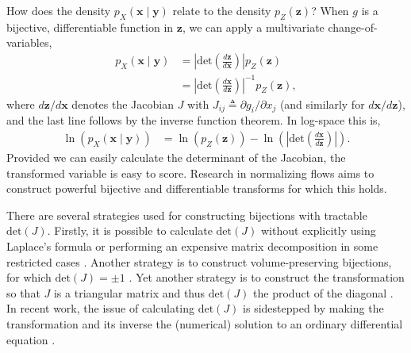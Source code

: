 How does the density $p_X(\mathbf{x}\mid\mathbf{y})$ relate to the density $p_Z(\mathbf{z})$? When $g$ is a bijective, differentiable function in $\mathbf{z}$, we can apply a multivariate change-of-variables,
\begin{align*}
	p_X(\mathbf{x}\mid\mathbf{y}) &= \left|\text{det}\left(\frac{d\mathbf{z}}{d\mathbf{x}}\right)\right|p_Z(\mathbf{z})\\
	&= \left|\text{det}\left(\frac{d\mathbf{x}}{d\mathbf{z}}\right)\right|^{-1}p_Z(\mathbf{z}),
\end{align*}
where $d\mathbf{z}/d\mathbf{x}$ denotes the Jacobian $J$ with $J_{ij}\triangleq\partial g_i/\partial x_j$ (and similarly for $d\mathbf{x}/d\mathbf{z}$), and the last line follows by the inverse function theorem. In log-space this is,
\begin{align*}
	\ln(p_X(\mathbf{x}\mid\mathbf{y})) &= \ln(p_Z(\mathbf{z})) - \ln\left(\left|\text{det}\left(\frac{d\mathbf{x}}{d\mathbf{z}}\right)\right|\right).
\end{align*}
Provided we can easily calculate the determinant of the Jacobian, the transformed variable is easy to score. Research in normalizing flows aims to construct powerful bijective and differentiable transforms for which this holds.

There are several strategies used for constructing bijections with tractable $\text{det}(J)$. Firstly, it is possible to calculate $\text{det}(J)$ without explicitly using Laplace's formula or performing an expensive matrix decomposition in some restricted cases \citep{RezendeMohamed2015,van2018sylvester}. Another strategy is to construct volume-preserving bijections, for which $\text{det}(J)=\pm1$ \citep{dinh2014nice, tomczak2016improving}. Yet another strategy is to construct the transformation so that $J$ is a triangular matrix and thus $\text{det}(J)$ the product of the diagonal \citep{KingmaEtAl2016, papamakarios2017masked, huang2018neural}. In recent work, the issue of calculating $\text{det}(J)$ is sidestepped by making the transformation and its inverse the (numerical) solution to an ordinary differential equation \citep{chen2018neural}.

